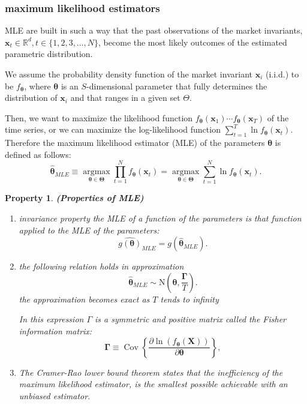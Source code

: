 \documentclass[13pt]{article}
\newtheorem{property}[theorem]{Property}
\theoremstyle{definition}
\theoremstyle{remark}
\begin{document}
\subsubsection{maximum likelihood estimators} MLE are built in such a way that the past observations of the market invariants, $\mathbf{x}_{t}\in \mathbb{R}^d, t\in \{1,2,3,\ldots, N\}$, become the most likely outcomes of the estimated parametric distribution. 

We assume the probability density function of the market invariant $\mathbf{x}_i$ (i.i.d.) to be $f_{\boldsymbol{\theta}}$, where $\boldsymbol{\theta}$ is an $S$-dimensional parameter that fully determines the distribution of $\mathbf{x}_i$ and that ranges in a given set $\Theta$.

Then, we want to maximize the likelihood function $f_{\boldsymbol{\theta}}\left(\mathbf{x}_1\right) \cdots f_{\boldsymbol{\theta}}\left(\mathbf{x}_T\right) $ of the time series, or we can maximize the log-likelihood function $\sum_{t=1}^T \ln f_{\boldsymbol{\theta}}\left(\mathbf{x}_t\right)$. Therefore the maximum likelihood estimator (MLE) of the parameters $\boldsymbol{\theta}$ is defined as follows:
$$
\widehat{\boldsymbol{\theta}}_{MLE} \equiv \underset{\boldsymbol{\theta} \in \boldsymbol{\Theta}}{\operatorname{argmax}} 
\prod_{t=1}^N  f_{\boldsymbol{\theta}}\left(\mathbf{x}_t\right) =\underset{\boldsymbol{\theta} \in \boldsymbol{\Theta}}{\operatorname{argmax}} \sum_{t=1}^N \ln f_{\boldsymbol{\theta}}\left(\mathbf{x}_t\right).
$$
\begin{property}
    \textbf{(Properties of MLE)} \begin{enumerate}[label=(\alph*)]
        \item  invariance property the MLE of a function of the parameters is that function applied to the MLE of the parameters:
$$
\widehat{g(\boldsymbol{\theta})}_{MLE}=g(\widehat{\boldsymbol{\theta}}_{MLE}).
$$
\item the following relation holds in approximation
$$
\widehat{\boldsymbol{\theta}}_{MLE} \sim \mathrm{N}\left(\boldsymbol{\theta}, \frac{\boldsymbol{\Gamma}}{T}\right) .
$$
 the approximation becomes exact as $T$ tends to infinity
 
In this expression $\Gamma$ is a symmetric and positive matrix called the Fisher information matrix:
$$
\boldsymbol{\Gamma} \equiv \operatorname{Cov}\left\{\frac{\partial \ln \left(f_{\boldsymbol{\theta}}(\mathbf{X})\right)}{\partial \boldsymbol{\theta}}\right\},
$$
\item The Cramer-Rao lower bound theorem states that the inefficiency of the maximum likelihood estimator, is the smallest possible achievable with an unbiased estimator.
    \end{enumerate} 
\end{property}
\end{document}
